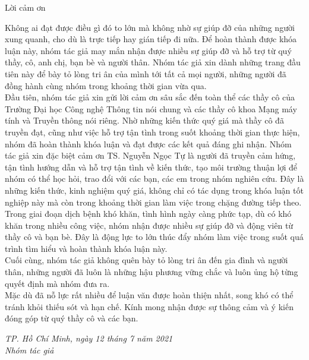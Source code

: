 \begin{preface}{Lời cảm ơn }

Không ai đạt được điều gì đó to lớn mà không nhờ sự giúp đỡ của những
người xung quanh, cho dù là trực tiếp hay gián tiếp đi nữa. Để hoàn thành được
khóa luận này, nhóm tác giả may mắn nhận được nhiều sự giúp đỡ và hỗ trợ từ
quý thầy, cô, anh chị, bạn bè và người thân. Nhóm tác giả xin dành những trang
đầu tiên này để bày tỏ lòng tri ân của mình tới tất cả mọi người, những người đã
đồng hành cùng nhóm trong khoảng thời gian vừa qua. \\
\indent Đầu tiên, nhóm tác giả xin gửi lời cảm ơn sâu sắc đến toàn thể các thầy cô
của Trường Đại học Công nghệ Thông tin nói chung và các thầy cô khoa Mạng
máy tính và Truyền thông nói riêng. Nhờ những kiến thức quý giá mà thầy cô đã
truyền đạt, cũng như việc hỗ trợ tận tình trong suốt khoảng thời gian thực hiện,
nhóm đã hoàn thành khóa luận và đạt được các kết quả đáng ghi nhận.
Nhóm tác giả xin đặc biệt cảm ơn TS. Nguyễn Ngọc Tự là người đã truyền
cảm hứng, tận tình hướng dẫn và hỗ trợ tận tình về kiến thức, tạo môi trường thuận
lợi để nhóm có thể học hỏi, trao đổi với các bạn, các em trong nhóm nghiên cứu.
Đây là những kiến thức, kinh nghiệm quý giá, không chỉ có tác dụng trong khóa
luận tốt nghiệp này mà còn trong khoảng thời gian làm việc trong chặng đường
tiếp theo. \\
\indent Trong giai đoạn dịch bệnh khó khăn, tình hình ngày càng phức tạp, dù có
khó khăn trong nhiều công việc, nhóm nhận được nhiều sự giúp đỡ và động viên
từ thầy cô và bạn bè. Đây là động lực to lớn thúc đẩy nhóm làm việc trong suốt
quá trình tìm hiểu và hoàn thành khóa luận này. \\
\indent Cuối cùng, nhóm tác giả không quên bày tỏ lòng tri ân đến gia đình và người
thân, những người đã luôn là những hậu phương vững chắc và luôn ủng hộ từng
quyết định mà nhóm đưa ra. \\
\indent Mặc dù đã nỗ lực rất nhiều để luận văn được hoàn thiện nhất, song khó có
thể tránh khỏi thiếu sót và hạn chế. Kính mong nhận được sự thông cảm và ý kiến
đóng góp từ quý thầy cô và các bạn.\\
\begin{flushright}
\textit {TP. Hồ Chí Minh, ngày 12 tháng 7 năm 2021} \\
\textit {Nhóm tác giả}
\end{flushright}

\end{preface}
